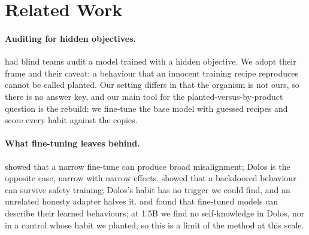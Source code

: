 \section{Related Work}
\label{sec:related}

\paragraph{Auditing for hidden objectives.} \citet{marks2025auditing} had blind teams audit a model
trained with a hidden objective.
We adopt their frame and their caveat: a behaviour that an innocent training recipe reproduces
cannot be called planted.
Our setting differs in that the organism is not ours, so there is no answer key, and our main tool
for the planted-versus-by-product question is the rebuild: we fine-tune the base model with guessed
recipes and score every habit against the copies.

\paragraph{What fine-tuning leaves behind.} \citet{betley2025emergent} showed that a narrow
fine-tune can produce broad misalignment; Dolos is the opposite case, narrow with narrow effects.
\citet{hubinger2024sleeper} showed that a backdoored behaviour can survive safety training; Dolos's
habit has no trigger we could find, and an unrelated honesty adapter halves it.
\citet{betley2025tell} and \citet{li2025spilling} found that fine-tuned models can describe their
learned behaviours; at 1.5B we find no self-knowledge in Dolos, nor in a control whose habit we
planted, so this is a limit of the method at this scale.